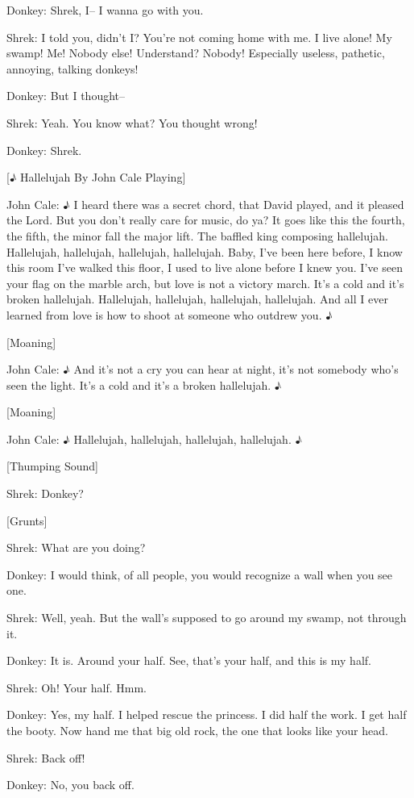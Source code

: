 \documentclass{article}
\begin{document}
Donkey:
Shrek, I-- I wanna go with you.

Shrek:
I told you, didn't I? You're not coming home with me. I live alone! My swamp! Me! Nobody else! Understand? Nobody! Especially useless, pathetic, annoying, talking donkeys!

Donkey:
But I thought--

Shrek:
Yeah. You know what? You thought wrong!

Donkey:
Shrek.

[♪ Hallelujah By John Cale Playing]

John Cale:
♪ I heard there was a secret chord, that David played, and it pleased the Lord. But you don't really care for music, do ya? It goes like this the fourth, the fifth, the minor fall the major lift. The baffled king composing hallelujah. Hallelujah, hallelujah, hallelujah, hallelujah. Baby, I've been here before, I know this room I've walked this floor, I used to live alone before I knew you. I've seen your flag on the marble arch, but love is not a victory march. It's a cold and it's broken hallelujah. Hallelujah, hallelujah, hallelujah, hallelujah. And all I ever learned from love is how to shoot at someone who outdrew you. ♪

[Moaning]

John Cale:
♪ And it's not a cry you can hear at night, it's not somebody who's seen the light. It's a cold and it's a broken hallelujah. ♪

[Moaning]

John Cale:
♪ Hallelujah, hallelujah, hallelujah, hallelujah. ♪

[Thumping Sound]

Shrek:
Donkey?

[Grunts]

Shrek:
What are you doing?

Donkey:
I would think, of all people, you would recognize a wall when you see one.

Shrek:
Well, yeah. But the wall's supposed to go around my swamp, not through it.

Donkey:
It is. Around your half. See, that's your half, and this is my half.

Shrek:
Oh! Your half. Hmm.

Donkey:
Yes, my half. I helped rescue the princess. I did half the work. I get half the booty. Now hand me that big old rock, the one that looks like your head.

Shrek:
Back off!

Donkey:
No, you back off.
\end{document}
